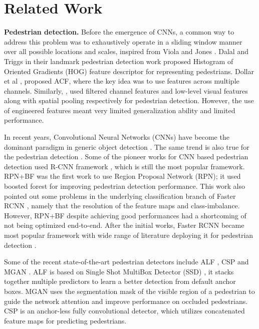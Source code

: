 \documentclass[final]{cvpr}
\begin{document}
 \section{Related Work} \label{sec:prev}

\noindent\textbf{Pedestrian detection.} Before the emergence of CNNs, a common  way to address this problem was to exhaustively operate in a sliding window manner over all possible locations and scales, inspired from Viola and Jones \cite{viola2004robust}. 
Dalal and Triggs in their landmark pedestrian detection work \cite{dalal2005histograms} proposed Histogram of Oriented Gradients (HOG) feature descriptor for representing pedestrians.
Dollar et al \cite{dollar2014fast}, proposed ACF, where the key idea was to use features across multiple channels. 
Similarly, \cite{zhang2017citypersons,paisitkriangkrai2014strengthening}, used filtered channel features and low-level visual features along with spatial pooling respectively for pedestrian detection. However, the use of engineered features meant very limited generalization ability and limited performance.    

In recent years, Convolutional Neural Networks (CNNs) have become the dominant paradigm in generic object detection \cite{ren2015faster,he2017mask,sun2018fishnet,liu2016ssd}.
The same trend is also true for the pedestrian detection \cite{angelova2015real,hosang2015taking,cai2015learning}. 
Some of the pioneer works for CNN based pedestrian detection \cite{hosang2015taking,zhang2016far} used R-CNN framework \cite{girshick2014rich}, which is still the most popular framework.
RPN+BF \cite{zhang2016faster} was the first work to use Region Proposal Network (RPN); it used boosted forest for improving pedestrian detection performance.
This work also pointed out some problems in the underlying classification branch of Faster RCNN \cite{ren2015faster}, namely that the resolution of the feature maps and class-imbalance. 
However, RPN+BF despite achieving good performances had a shortcoming of not being optimized end-to-end. After the initial works, Faster RCNN \cite{ren2015faster} became most popular framework with wide range of literature deploying it for pedestrian detection \cite{zhou2018bi,zhang2017citypersons,cai2016unified,brazil2017illuminating,mao2017can}. 

Some of the recent state-of-the-art pedestrian detectors include ALF \cite{liu2018learning}, CSP \cite{Liu2018DBC} and MGAN \cite{pang2019maskguided}.
ALF \cite{liu2018learning} is based on Single Shot MultiBox Detector (SSD) \cite{liu2016ssd}, it stacks together multiple predictors to learn a better detection from default anchor boxes.
MGAN \cite{pang2019maskguided} uses the segmentation mask of the visible region of a pedestrian to guide the network attention and improve performance on occluded pedestrians.
CSP is an anchor-less fully convolutional detector, which utilizes concatenated feature maps for predicting pedestrians.
\end{document}
